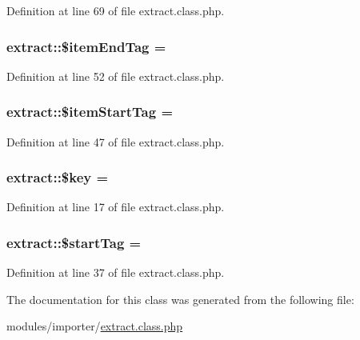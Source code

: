 Definition at line 69 of file extract.\+class.\+php.

\hypertarget{classextract_abddb079afc9c7c2f210e7793b93388e5}{}
\subsubsection[{\$item\+End\+Tag}]{\setlength{\rightskip}{0pt plus 5cm}extract\+::\$item\+End\+Tag = \textquotesingle{}\textquotesingle{}}\label{classextract_abddb079afc9c7c2f210e7793b93388e5}


Definition at line 52 of file extract.\+class.\+php.

\hypertarget{classextract_a11629128aedd1fc4b0a889640c693d0a}{}
\subsubsection[{\$item\+Start\+Tag}]{\setlength{\rightskip}{0pt plus 5cm}extract\+::\$item\+Start\+Tag = \textquotesingle{}\textquotesingle{}}\label{classextract_a11629128aedd1fc4b0a889640c693d0a}


Definition at line 47 of file extract.\+class.\+php.

\hypertarget{classextract_a894aac7e47b9ed0773922aa7eb9ce578}{}
\subsubsection[{\$key}]{\setlength{\rightskip}{0pt plus 5cm}extract\+::\$key = \textquotesingle{}\textquotesingle{}}\label{classextract_a894aac7e47b9ed0773922aa7eb9ce578}


Definition at line 17 of file extract.\+class.\+php.

\hypertarget{classextract_a3acbe3af3d1b083b33023202a5e05432}{}
\subsubsection[{\$start\+Tag}]{\setlength{\rightskip}{0pt plus 5cm}extract\+::\$start\+Tag = \textquotesingle{}\textquotesingle{}}\label{classextract_a3acbe3af3d1b083b33023202a5e05432}


Definition at line 37 of file extract.\+class.\+php.



The documentation for this class was generated from the following file\+:\begin{DoxyCompactItemize}
\item 
modules/importer/\hyperlink{extract_8class_8php}{extract.\+class.\+php}\end{DoxyCompactItemize}
